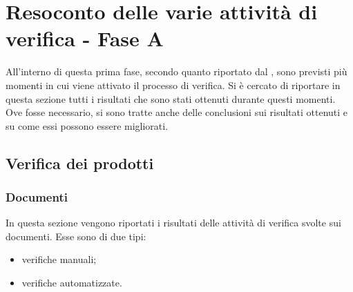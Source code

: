 \section{Resoconto delle varie attività di verifica - Fase A} \label{app:esiti}
	All'interno di questa prima fase, secondo quanto riportato dal , sono previsti più momenti in cui viene attivato il 
	processo di verifica. Si è cercato di riportare in questa sezione tutti i risultati che sono stati ottenuti durante questi momenti. Ove fosse 
	necessario, si sono tratte anche delle conclusioni sui risultati ottenuti e su come essi possono essere migliorati.
	\subsection{Verifica dei prodotti}
		\subsubsection{Documenti}
			In questa sezione vengono riportati i risultati delle attività di verifica svolte sui documenti. Esse sono di due tipi:
			\begin{itemize}
				\item verifiche manuali;
				\item verifiche automatizzate.
			\end{itemize}
